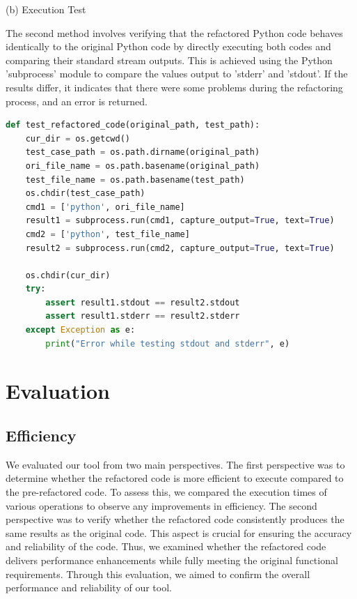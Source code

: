 \documentclass[11pt]{article}
\begin{document}
(b) Execution Test

The second method involves verifying that the refactored Python code behaves identically to the original Python code by directly executing both codes and comparing their standard stream outputs. This is achieved using the Python 'subprocess' module to compare the values output to 'stderr' and 'stdout'. If the results differ, it indicates that there were some problems during the refactoring process, and an error is returned. \\

\begin{lstlisting}[language=python]
def test_refactored_code(original_path, test_path):
    cur_dir = os.getcwd()
    test_case_path = os.path.dirname(original_path)
    ori_file_name = os.path.basename(original_path)
    test_file_name = os.path.basename(test_path)
    os.chdir(test_case_path)
    cmd1 = ['python', ori_file_name]
    result1 = subprocess.run(cmd1, capture_output=True, text=True)
    cmd2 = ['python', test_file_name]
    result2 = subprocess.run(cmd2, capture_output=True, text=True)

    os.chdir(cur_dir)
    try:
        assert result1.stdout == result2.stdout
        assert result1.stderr == result2.stderr
    except Exception as e:
        print("Error while testing stdout and stderr", e)
\end{lstlisting}

\section{Evaluation}

\subsection{Efficiency}

We evaluated our tool from two main perspectives. The first perspective was to determine whether the refactored code is more efficient to execute compared to the pre-refactored code. To assess this, we compared the execution times of various operations to observe any improvements in efficiency. The second perspective was to verify whether the refactored code consistently produces the same results as the original code. This aspect is crucial for ensuring the accuracy and reliability of the code. Thus, we examined whether the refactored code delivers performance enhancements while fully meeting the original functional requirements. Through this evaluation, we aimed to confirm the overall performance and reliability of our tool.
\end{document}

